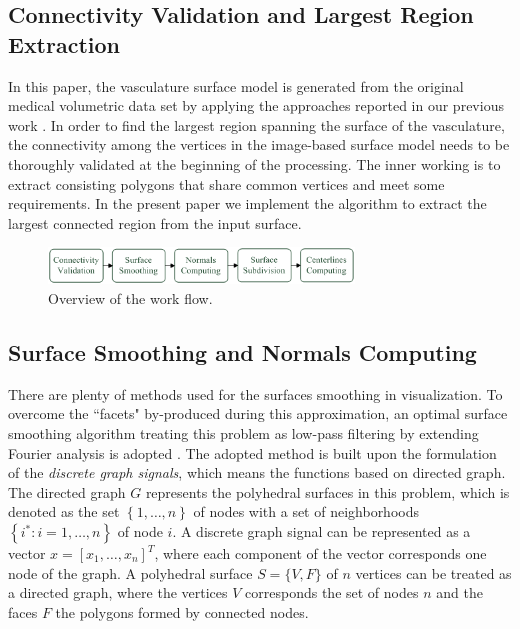 
\subsection{Connectivity Validation and Largest Region Extraction}

In this paper, the vasculature surface model is generated from the original medical volumetric data set by applying the approaches reported in our previous work \cite{Yang2014ICRA}. %
In order to find the largest region spanning the surface of the vasculature, the connectivity among the vertices in the image-based surface model needs to be thoroughly validated at the beginning of the processing. %
The inner working is to extract consisting polygons that share common vertices and meet some requirements.
In the present paper we implement the algorithm to extract the largest connected region from the input surface.
\begin{figure}[t]
\centering
\includegraphics[width=3.2in]{Figures/DataFlow3.png}
\caption{Overview of the work flow.}
\label{fig:DataFlow}
\end{figure}

\subsection{Surface Smoothing and Normals Computing}

There are plenty of methods used for the surfaces smoothing in visualization.
To overcome the ``facets" by-produced during this approximation, an optimal surface smoothing algorithm treating this problem as low-pass filtering by extending Fourier analysis is adopted \cite{Taubin1996}. %
The adopted method is built upon the formulation of the \emph{discrete graph signals}, which means the functions based on directed graph.
The directed graph $G$ represents the polyhedral surfaces in this problem, which is denoted as the set $\left\{ 1, \ldots, n \right\}$ of nodes with a set of neighborhoods $\left\{ i^{\ast}: i = 1, \ldots, n \right\}$ of node $i$. %
A discrete graph signal can be represented as a vector $x = \left[ x_1, \ldots, x_n \right]^T$, where each component of the vector corresponds one node of the graph.
A polyhedral surface $S = \{ V, F \}$ of $n$ vertices can be treated as a directed graph, where the vertices $V$ corresponds the set of nodes $n$ and the faces $F$ the polygons formed by connected nodes. %

